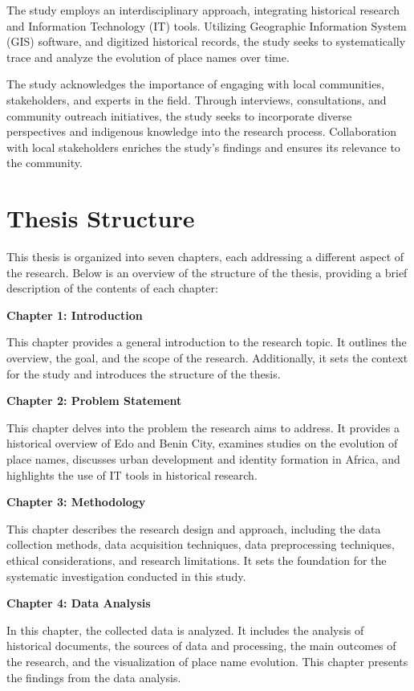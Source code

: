 The study employs an interdisciplinary approach, integrating historical research and Information Technology (IT) tools. Utilizing Geographic Information System (GIS) software, and digitized historical records, the study seeks to systematically trace and analyze the evolution of place names over time.


The study acknowledges the importance of engaging with local communities, stakeholders, and experts in the field. Through interviews, consultations, and community outreach initiatives, the study seeks to incorporate diverse perspectives and indigenous knowledge into the research process. Collaboration with local stakeholders enriches the study's findings and ensures its relevance to the community.

\section{Thesis Structure}

This thesis is organized into seven chapters, each addressing a different aspect of the research. Below is an overview of the structure of the thesis, providing a brief description of the contents of each chapter:

\textbf{Chapter 1: Introduction}

This chapter provides a general introduction to the research topic. It outlines the overview, the goal, and the scope of the research. Additionally, it sets the context for the study and introduces the structure of the thesis.

\textbf{Chapter 2: Problem Statement}

This chapter delves into the problem the research aims to address. It provides a historical overview of Edo and Benin City, examines studies on the evolution of place names, discusses urban development and identity formation in Africa, and highlights the use of IT tools in historical research.

\textbf{Chapter 3: Methodology}

This chapter describes the research design and approach, including the data collection methods, data acquisition techniques, data preprocessing techniques, ethical considerations, and research limitations. It sets the foundation for the systematic investigation conducted in this study.

\textbf{Chapter 4: Data Analysis}

In this chapter, the collected data is analyzed. It includes the analysis of historical documents, the sources of data and processing, the main outcomes of the research, and the visualization of place name evolution. This chapter presents the findings from the data analysis.

